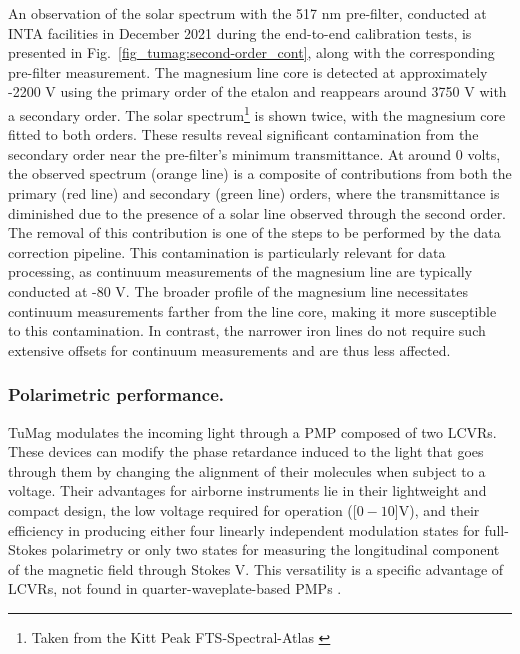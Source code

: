 An observation of the solar spectrum with the 517 nm pre-filter, conducted at INTA facilities in December 2021 during the end-to-end calibration tests, is presented in Fig.~\ref{fig_tumag:second-order_cont}, along with the corresponding pre-filter measurement. The magnesium line core is detected at approximately -2200 V using the primary order of the etalon and reappears around 3750 V with a secondary order. The solar spectrum\footnote{Taken from the Kitt Peak FTS-Spectral-Atlas \citep{fts}} is shown twice, with the magnesium core fitted to both orders. These results reveal significant contamination from the secondary order near the pre-filter's minimum transmittance. At around 0 volts, the observed spectrum (orange line) is a composite of contributions from both the primary (red line) and secondary (green line) orders, where the transmittance is diminished due to the presence of a solar line observed through the second order. The removal of this contribution is one of the steps to be performed by the data correction pipeline. This contamination is particularly relevant for data processing, as continuum measurements of the magnesium line are typically conducted at -80 V. The broader profile of the magnesium line necessitates continuum measurements farther from the line core, making it more susceptible to this contamination. In contrast, the narrower iron lines do not require such extensive offsets for continuum measurements and are thus less affected.

\subsubsection{\label{sect:tumag_cal polarimetric}Polarimetric performance.}

TuMag modulates the incoming light through a PMP composed of two LCVRs. These devices can modify the phase retardance induced to the light that goes through them by changing the alignment of their molecules when subject to a voltage. Their advantages for airborne instruments lie in their lightweight and compact design, the low voltage required for operation ([$0 - 10$]V), and their efficiency in producing either four linearly independent modulation states for full-Stokes polarimetry or only two states for measuring the longitudinal component of the magnetic field through Stokes V. This versatility is a specific advantage of LCVRs, not found in quarter-waveplate-based PMPs \citep{pmp-advantages}.

